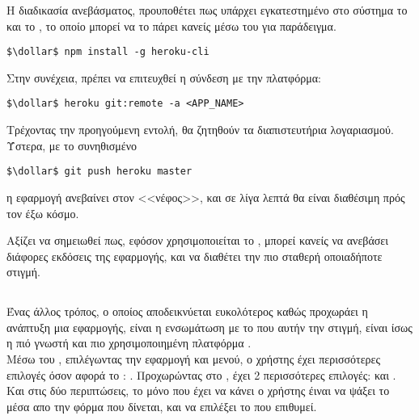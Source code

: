 Η διαδικασία ανεβάσματος, προυποθέτει πως υπάρχει εγκατεστημένο στο σύστημα το  και το , το οποίο μπορεί να το πάρει κανείς μέσω του  για παράδειγμα.
    \begin{lstlisting}[language=command.com]
    $\dollar$ npm install -g heroku-cli
    \end{lstlisting}
\quad Στην συνέχεια, πρέπει να επιτευχθεί η σύνδεση  με την πλατφόρμα:
    \begin{lstlisting}[language=command.com]
    $\dollar$ heroku git:remote -a <APP_NAME>
    \end{lstlisting}
\quad Τρέχοντας την προηγούμενη εντολή, θα ζητηθούν τα διαπιστευτήρια λογαριασμού. Ύστερα, με το συνηθισμένο 
    \begin{lstlisting}[language=command.com]
    $\dollar$ git push heroku master
    \end{lstlisting}
 η εφαρμογή ανεβαίνει στον <<νέφος>>, και σε λίγα λεπτά θα είναι διαθέσιμη πρός τον έξω κόσμο.

Αξίζει να σημειωθεί πως, εφόσον χρησιμοποιείται το , μπορεί κανείς να ανεβάσει διάφορες εκδόσεις της εφαρμογής, και να διαθέτει την πιο σταθερή οποιαδήποτε στιγμή.

\subsection*{}
\pSpace Ένας άλλος τρόπος, ο οποίος αποδεικνύεται ευκολότερος καθώς προχωράει η ανάπτυξη μια εφαρμογής, είναι η ενσωμάτωση με το  που αυτήν την στιγμή, είναι ίσως η πιό γνωστή και πιο χρησιμοποιημένη πλατφόρμα .\\
\pSpace Μέσω του , επιλέγωντας την εφαρμογή και  μενού, ο χρήστης έχει περισσότερες επιλογές όσον αφορά το : . Προχωρώντας στο , έχει 2 περισσότερες επιλογές:  και .\\
\pSpace Και στις δύο περιπτώσεις, το μόνο που έχει να κάνει ο χρήστης έιναι να ψάξει το  μέσα απο την φόρμα που δίνεται, και να επιλέξει το  που επιθυμεί.